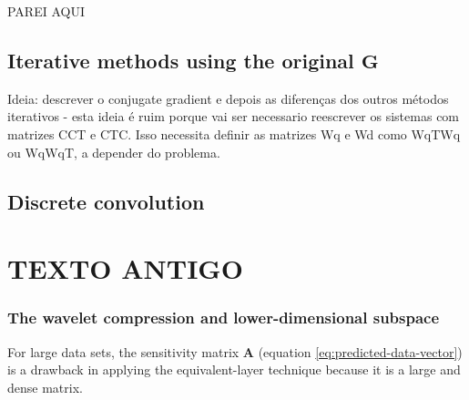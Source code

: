 PAREI AQUI

\subsection{Iterative methods using the original $\mathbf{G}$}

Ideia: descrever o conjugate gradient e depois as diferenças dos outros métodos iterativos - esta ideia é ruim
porque vai ser necessario reescrever os sistemas com matrizes CCT e CTC. Isso necessita definir as matrizes
Wq e Wd como WqTWq ou WqWqT, a depender do problema.

\cite{xia-sprowl1991}

\cite{xia-etal1993}

\cite{siqueira-etal2017}

\cite{jirigalatu-ebbing2019}


\subsection{Discrete convolution}

\cite{takahashi-etal2020}

\cite{takahashi-etal2022}

\section{TEXTO ANTIGO}

\subsubsection{The wavelet compression and lower-dimensional subspace}

For large data sets, the  sensitivity matrix $\mathbf{A}$ (equation \ref{eq:predicted-data-vector}) is a drawback in applying  
the equivalent-layer technique because it is a large and dense matrix.

